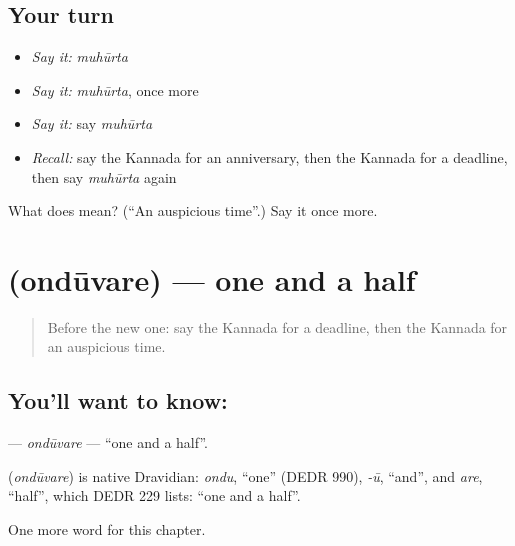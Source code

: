 \subsection*{Your turn}
\begin{itemize}
\raggedright
  \item \emph{Say it:} \emph{muhūrta}
  \item \emph{Say it:} \emph{muhūrta}, once more
  \item \emph{Say it:} say \emph{muhūrta}
  \item \emph{Recall:} say the Kannada for an anniversary, then the Kannada for a deadline, then say \emph{muhūrta} again
\end{itemize}

\begin{tcolorbox}[breakable,colback=teal!4,colframe=teal!35!black,title={Before you move on}]
What does  mean? (\textquotedblleft{}An auspicious time\textquotedblright{}.) Say it once more.
\end{tcolorbox}
\section[\texorpdfstring{\kn{ಒಂದೂವರೆ} (ondūvare)}{ಒಂದೂವರೆ (ondūvare)}]{ (ondūvare) — one and a half}

\label{lesson:KA-C248-onduvare}



\begin{quote}
Before the new one: say the Kannada for a deadline, then the Kannada for an auspicious time.
\end{quote}

\subsection*{You'll want to know: }
\textbf{} — \emph{ondūvare} — \textquotedblleft{}one and a half\textquotedblright{}.

\begin{cousinweb}
\textbf{} (\emph{ondūvare}) is native Dravidian: \emph{ondu}, \textquotedblleft{}one\textquotedblright{} (DEDR 990), \emph{-ū}, \textquotedblleft{}and\textquotedblright{}, and \emph{are}, \textquotedblleft{}half\textquotedblright{}, which DEDR 229 lists: \textquotedblleft{}one and a half\textquotedblright{}.
\end{cousinweb}

\begin{grammarlens}[title={What you've built}]
One more word for this chapter.
\end{grammarlens}

